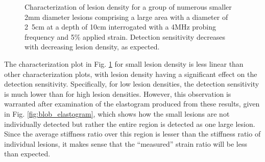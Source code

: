 			\begin{figure}[!t]
				\centering
				\caption{Characterization of lesion density for a group of numerous smaller \unit{2}{mm} diameter lesions comprising a large area with a diameter of \unit{2.5}{cm} at a depth of \unit{10}{cm} interrogated with a \unit{4}{MHz} probing frequency and \unit{5}{\%} applied strain. Detection sensitivity decreases with decreasing lesion density, as expected.}
				\label{fig:blob_density_characterization}
			\end{figure}

			The characterization plot in Fig. \ref{fig:blob_density_characterization} for small lesion density is less linear than other characterization plots, with lesion density having a significant effect on the detection sensitivity. Specifically, for low lesion densities, the detection sensitivity is much lower than for high lesion densities. However, this observation is warranted after examination of the elastogram produced from these results, given in Fig. \ref{fig:blob_elastogram}, which shows how the small lesions are not individually detected but rather the entire region is detected as one large lesion. Since the average stiffness ratio over this region is lesser than the stiffness ratio of individual lesions, it makes sense that the ``measured'' strain ratio will be less than expected.


